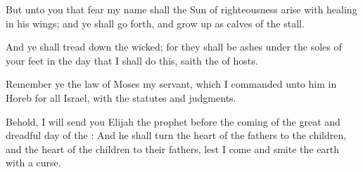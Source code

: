 \verse But unto you that fear my name shall the Sun of righteousness arise with healing in his wings; and ye shall go forth, and grow up as calves of the stall.

\verse And ye shall tread down the wicked; for they shall be ashes under the soles of your feet in the day that I shall do this, saith the \LORD of hosts.

\verse Remember ye the law of Moses my servant, which I commanded unto him in Horeb for all Israel, with the statutes and judgments.

\verse Behold, I will send you Elijah the prophet before the coming of the great and dreadful day of the \LORD: \verse And he shall turn the heart of the fathers to the children, and the heart of the children to their fathers, lest I come and smite the earth with a curse.

